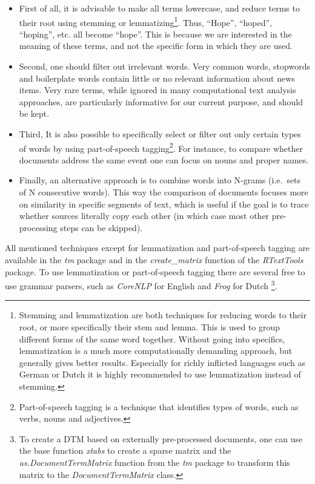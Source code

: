 \begin{itemize}
\item
  First of all, it is advisable to make all terms lowercase, and reduce
  terms to their root using stemming or lemmatizing\footnote{Stemming
    and lemmatization are both techniques for reducing words to their
    root, or more specifically their stem and lemma. This is used to
    group different forms of the same word together. Without going into
    specifics, lemmatization is a much more computationally demanding
    approach, but generally gives better results. Especially for richly
    inflicted languages such as German or Dutch it is highly recommended
    to use lemmatization instead of stemming.}. Thus, ``Hope'',
  ``hoped'', ``hoping'', etc. all become ``hope''. This is because we
  are interested in the meaning of these terms, and not the specific
  form in which they are used.
\item
  Second, one should filter out irrelevant words. Very common words,
  stopwords and boilerplate words contain little or no relevant
  information about news items. Very rare terms, while ignored in many
  computational text analysis approaches, are particularly informative
  for our current purpose, and should be kept.
\item
  Third, It is also possible to specifically select or filter out only
  certain types of words by using part-of-speech tagging\footnote{Part-of-speech
    tagging is a technique that identifies types of words, such as
    verbs, nouns and adjectives.}. For instance, to compare whether
  documents address the same event one can focus on nouns and proper
  names.
\item
  Finally, an alternative approach is to combine words into N-grams
  (i.e.~sets of N consecutive words). This way the comparison of
  documents focuses more on similarity in specific segments of text,
  which is useful if the goal is to trace whether sources literally copy
  each other (in which case most other pre-processing steps can be
  skipped).
\end{itemize}

All mentioned techniques except for lemmatization and part-of-speech
tagging are available in the \emph{tm} package and in the
\emph{create\_matrix} function of the \emph{RTextTools} package. To use
lemmatization or part-of-speech tagging there are several free to use
grammar parsers, such as \emph{CoreNLP} for English \citep{corenlp} and
\emph{Frog} for Dutch \citep{bosch07}\footnote{To create a DTM based on
  externally pre-processed documents, one can use the base function
  \emph{xtabs} to create a sparse matrix and the
  \emph{as.DocumentTermMatrix} function from the \emph{tm} package to
  transform this matrix to the \emph{DocumentTermMatrix} class.}.

